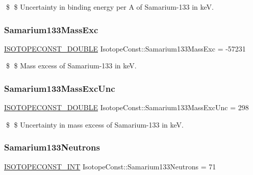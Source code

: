 \$ \$ Uncertainty in binding energy per A of Samarium-\/133 in keV. \mbox{\label{group___isotope_const-_samarium-_sm133_ga449ab14539e1e3324457cb46decfc114}} 
\subsubsection{\texorpdfstring{Samarium133\+Mass\+Exc}{Samarium133MassExc}}
{\footnotesize\ttfamily \mbox{\hyperlink{group___isotope_const-_macros_ga8f45a7272ce02c0b4c65c44636ed719a}{I\+S\+O\+T\+O\+P\+E\+C\+O\+N\+S\+T\+\_\+\+D\+O\+U\+B\+LE}} Isotope\+Const\+::\+Samarium133\+Mass\+Exc = -\/57231}

\$ \$ Mass excess of Samarium-\/133 in keV. \mbox{\label{group___isotope_const-_samarium-_sm133_ga0f50ee17c5b23ad13264ea301fe1655d}} 
\subsubsection{\texorpdfstring{Samarium133\+Mass\+Exc\+Unc}{Samarium133MassExcUnc}}
{\footnotesize\ttfamily \mbox{\hyperlink{group___isotope_const-_macros_ga8f45a7272ce02c0b4c65c44636ed719a}{I\+S\+O\+T\+O\+P\+E\+C\+O\+N\+S\+T\+\_\+\+D\+O\+U\+B\+LE}} Isotope\+Const\+::\+Samarium133\+Mass\+Exc\+Unc = 298}

\$ \$ Uncertainty in mass excess of Samarium-\/133 in keV. \mbox{\label{group___isotope_const-_samarium-_sm133_ga88648cf13aa4b413e484aaa03f31e62d}} 
\subsubsection{\texorpdfstring{Samarium133\+Neutrons}{Samarium133Neutrons}}
{\footnotesize\ttfamily \mbox{\hyperlink{group___isotope_const-_macros_ga5f18360b3e99483a35c32d789e62621c}{I\+S\+O\+T\+O\+P\+E\+C\+O\+N\+S\+T\+\_\+\+I\+NT}} Isotope\+Const\+::\+Samarium133\+Neutrons = 71}

